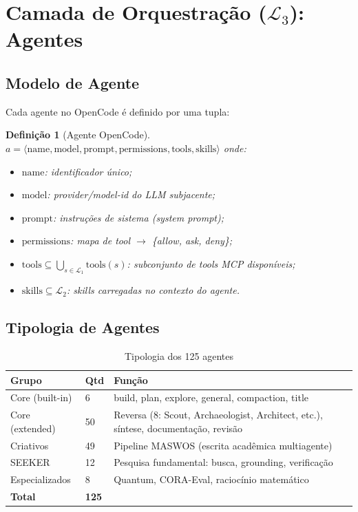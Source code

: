 \documentclass[12pt,a4paper,sumario=tradicional]{abntex2}
\newtheorem{definition}{Definição}[chapter]
\begin{document}
\section{Camada de Orquestração ($\mathcal{L}_3$): Agentes}

\subsection{Modelo de Agente}

Cada agente no OpenCode é definido por uma tupla:

\begin{definition}[Agente OpenCode]
$a = \langle \text{name}, \text{model}, \text{prompt}, \text{permissions}, \text{tools}, \text{skills} \rangle$ onde:
\begin{itemize}
    \item $\text{name}$: identificador único;
    \item $\text{model}$: provider/model-id do LLM subjacente;
    \item $\text{prompt}$: instruções de sistema (system prompt);
    \item $\text{permissions}$: mapa de tool $\rightarrow$ \{allow, ask, deny\};
    \item $\text{tools} \subseteq \bigcup_{s \in \mathcal{L}_1} \text{tools}(s)$: subconjunto de tools MCP disponíveis;
    \item $\text{skills} \subseteq \mathcal{L}_2$: skills carregadas no contexto do agente.
\end{itemize}
\end{definition}

\subsection{Tipologia de Agentes}

\begin{table}[H]
\centering
\caption{Tipologia dos 125 agentes}
\label{tab:agents}
\begin{tabular}{@{}llp{5cm}@{}}
\toprule
\textbf{Grupo} & \textbf{Qtd} & \textbf{Função} \\
\midrule
Core (built-in) & 6 & build, plan, explore, general, compaction, title \\
Core (extended) & 50 & Reversa (8: Scout, Archaeologist, Architect, etc.), síntese, documentação, revisão \\
Criativos & 49 & Pipeline MASWOS (escrita acadêmica multiagente) \\
SEEKER & 12 & Pesquisa fundamental: busca, grounding, verificação \\
Especializados & 8 & Quantum, CORA-Eval, raciocínio matemático \\
\midrule
\textbf{Total} & \textbf{125} & \\
\bottomrule
\end{tabular}
\end{table}
\end{document}
